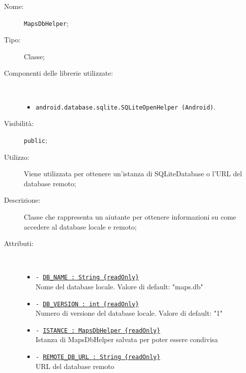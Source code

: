 \documentclass[../DefinizioneDiProdotto.tex]{subfiles}
\begin{document}
    \begin{description}
\item[Nome:] \texttt{MapsDbHelper};
\item[Tipo:] Classe;
\item[Componenti delle librerie utilizzate:] \
\begin{itemize}
\item \texttt{android.database.sqlite.SQLiteOpenHelper (Android)}.

\end{itemize}
\item[Visibilità:] \texttt{public};
\item[Utilizzo:] Viene utilizzata per ottenere un'istanza di SQLiteDatabase o l'URL del database remoto;
\item[Descrizione:] Classe che rappresenta un aiutante per ottenere informazioni su come accedere al database locale e remoto;
\item[Attributi:] \
\begin{itemize}
\item \texttt{- \underline{DB\_NAME : String \{readOnly\}}}\\
Nome del database locale. Valore di default: "maps.db"

\item \texttt{- \underline{DB\_VERSION : int \{readOnly\}}}\\
Numero di versione del database locale. Valore di default: "1"

\item \texttt{- \underline{ISTANCE : MapsDbHelper \{readOnly\}}}\\
Istanza di MapsDbHelper salvata per poter essere condivisa

\item \texttt{- \underline{REMOTE\_DB\_URL : String \{readOnly\}}}\\
URL del database remoto


\end{itemize}
\end{description}
\end{document}
